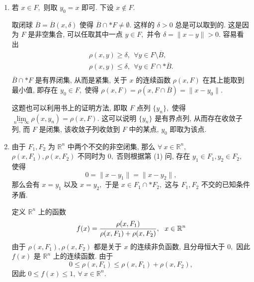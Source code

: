 \begin{solution}
\begin{enumerate}
\item 若 $x \in F,$ 则取 $y_0 = x$ 即可. 下设 $x \not\in F$.

取闭球 $\overline{B} = \overline{B}(x, \delta)$ 使得 $\overline{B} \cap* F \neq \emptyset.$ 这样的 $\delta > 0$ 总是可以取到的. 这是因为 $F$ 是非空集合, 可以任取其中一点 $y \in F,$ 并令 $\delta = \lVert x - y \rVert > 0.$ 容易看出
\begin{equation*}
\begin{gathered}
\rho(x, y) \geqslant \delta, ~~ \forall y \in F \setminus \overline{B}, \\
\rho(x, y) \leqslant \delta, ~~ \forall y \in F \cap* \overline{B}. \\
\end{gathered}
\end{equation*}
$\overline{B} \cap* F$ 是有界闭集, 从而是紧集, 关于 $x$ 的连续函数 $\rho(x, F)$ 在其上能取到最小值, 即存在 $y_0 \in F,$ 使得 $\rho(x, F) = \rho(x, F \cap \overline{B}) = \lVert x - y_0 \rVert.$ 

这题也可以利用书上的证明方法, 即取 $F$ 点列 $\{y_n\},$ 使得 $\lim\limits_{n\to\infty} \rho(x, y_n) = \rho(x, F).$ 这可以说明 $\{y_n\}$ 是有界点列, 从而存在收敛子列, 而 $F$ 是闭集, 该收敛子列收敛到 $F$ 中的某点, $y_0$ 即取为该点.

\item 由于 $F_1, F_2$ 为 $\mathbb{R}^n$ 中两个不交的非空闭集, 那么 $\forall ~ x \in \mathbb{R}^n,$ $\rho(x, F_1), \rho(x, F_2)$ 不同时为 $0,$ 否则根据第 (1) 问, 存在 $y_1 \in F_1, y_2 \in F_2,$ 使得
$$0 = \lVert x - y_1 \rVert = \lVert x - y_2 \rVert,$$
那么会有 $x = y_1$ 以及 $x = y_2,$ 于是 $x \in F_1 \cap* F_2,$ 这与 $F_1, F_2$ 不交的已知条件矛盾.

定义 $\mathbb{R}^n$ 上的函数
\begin{equation*}
f(x) = \dfrac{\rho(x, F_1)}{\rho(x, F_1) + \rho(x, F_2)}, ~~ x \in \mathbb{R}^n \score{5}
\end{equation*}
由于 $\rho(x, F_1), \rho(x, F_2)$ 都是关于 $x$ 的连续非负函数, 且分母恒大于 $0,$ 因此$f(x)$ 是 $\mathbb{R}^n$ 上的连续函数. 由于
$$0 \leqslant \rho(x, F_1) \leqslant \rho(x, F_1) + \rho(x, F_2),$$
因此 $0 \leqslant f(x) \leqslant 1, ~ \forall ~ x \in \mathbb{R}^n.$


\end{enumerate}
\end{solution}
